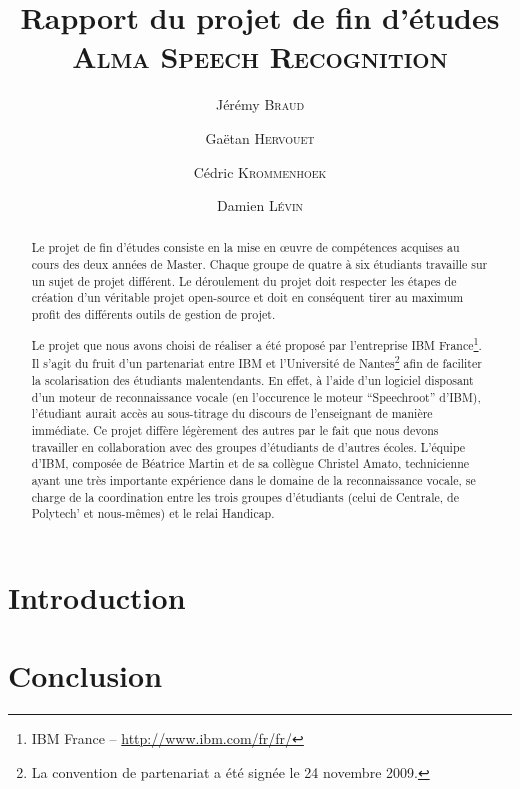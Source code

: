 \documentclass[a4paper,11pt]{report}
\title{Rapport du projet de fin d'études\\
	\huge{\textsc{Alma Speech Recognition}}}
\author{Jérémy \textsc{Braud} \and Gaëtan \textsc{Hervouet} \and Cédric \textsc{Krommenhoek} \and Damien \textsc{Lévin}}
\begin{document}
\maketitle

\begin{abstract}
Le projet de fin d'études consiste en la mise en \oe{}uvre de compétences acquises au cours des deux années de Master.
Chaque groupe de quatre à six étudiants travaille sur un sujet de projet différent.
Le déroulement du projet doit respecter les étapes de création d'un véritable projet open-source et doit en conséquent tirer au maximum profit des différents outils de gestion de projet.

Le projet que nous avons choisi de réaliser a été proposé par l'entreprise IBM France\footnote{IBM France -- \url{http://www.ibm.com/fr/fr/}}.
Il s'agit du fruit d'un partenariat entre IBM et l'Université de Nantes\footnote{La convention de partenariat a été signée le 24 novembre 2009.} afin de faciliter la scolarisation des étudiants malentendants.
En effet, à l'aide d'un logiciel disposant d'un moteur de reconnaissance vocale (en l'occurence le moteur ``Speechroot'' d'IBM), l'étudiant aurait accès au sous-titrage du discours de l'enseignant de manière immédiate.
Ce projet diffère légèrement des autres par le fait que nous devons travailler en collaboration avec des groupes d'étudiants de d'autres écoles.
L'équipe d'IBM, composée de Béatrice Martin et de sa collègue Christel Amato, technicienne ayant une très importante expérience dans le domaine de la reconnaissance vocale, se charge de la coordination entre les trois groupes d'étudiants (celui de Centrale, de Polytech' et nous-mêmes) et le relai Handicap.
\end{abstract}

\tableofcontents

\chapter*{Introduction}






\chapter*{Conclusion}




\end{document}
